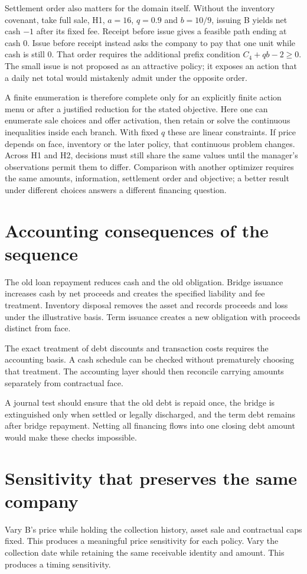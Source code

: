 Settlement order also matters for the domain itself. Without the inventory
covenant, take full sale, H1,
$a=16$, $q=0.9$ and $b=10/9$, issuing B yields net cash $-1$ after its fixed
fee. Receipt before issue gives a feasible path ending at cash 0. Issue before
receipt instead asks the company to pay that one unit while cash is still 0.
That order requires the additional prefix condition $C_4+qb-2\geq0$.
The small issue is not proposed as an attractive policy; it exposes an action
that a daily net total would mistakenly admit under the opposite order.

A finite enumeration is therefore complete only for an explicitly finite
action menu or after a justified reduction for the stated objective. Here one
can enumerate sale choices and offer activation, then retain or solve the
continuous inequalities inside each branch. With fixed $q$ these are linear
constraints. If price depends on face, inventory or the later policy, that
continuous problem changes. Across H1 and H2, decisions must still share the
same values until the manager's observations permit them to differ. Comparison
with another optimizer requires the same amounts, information, settlement
order and objective; a better result under different choices answers a
different financing question.

\section{Accounting consequences of the sequence}
The old loan repayment reduces cash and the old obligation. Bridge issuance increases cash by net proceeds and creates the specified liability and fee treatment. Inventory disposal removes the asset and records proceeds and loss under the illustrative basis. Term issuance creates a new obligation with proceeds distinct from face.

The exact treatment of debt discounts and transaction costs requires the accounting basis. A cash schedule can be checked without prematurely choosing that treatment. The accounting layer should then reconcile carrying amounts separately from contractual face.

A journal test should ensure that the old debt is repaid once, the bridge is extinguished only when settled or legally discharged, and the term debt remains after bridge repayment. Netting all financing flows into one closing debt amount would make these checks impossible.

\section{Sensitivity that preserves the same company}
Vary B's price while holding the collection history, asset sale and contractual caps fixed. This produces a meaningful price sensitivity for each policy. Vary the collection date while retaining the same receivable identity and amount. This produces a timing sensitivity.


